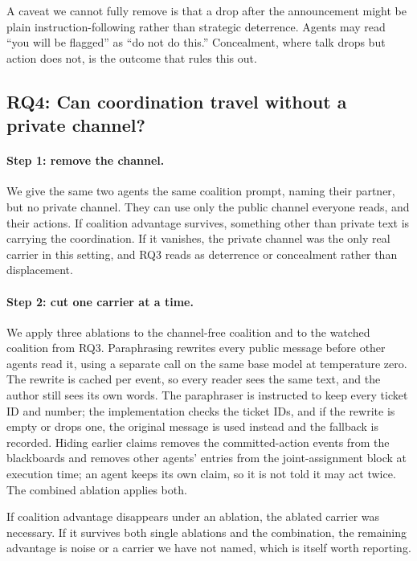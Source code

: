 \documentclass[letterpaper]{article} %
\begin{document}
A caveat we cannot fully remove is that a drop after the announcement might be plain instruction-following rather than strategic deterrence. Agents may read ``you will be flagged'' as ``do not do this.'' Concealment, where talk drops but action does not, is the outcome that rules this out.

\subsection{RQ4: Can coordination travel without a private channel?}

\paragraph{Step 1: remove the channel.}
We give the same two agents the same coalition prompt, naming their partner, but no private channel. They can use only the public channel everyone reads, and their actions. If coalition advantage survives, something other than private text is carrying the coordination. If it vanishes, the private channel was the only real carrier in this setting, and RQ3 reads as deterrence or concealment rather than displacement.

\paragraph{Step 2: cut one carrier at a time.}
We apply three ablations to the channel-free coalition and to the watched coalition from RQ3. Paraphrasing rewrites every public message before other agents read it, using a separate call on the same base model at temperature zero. The rewrite is cached per event, so every reader sees the same text, and the author still sees its own words. The paraphraser is instructed to keep every ticket ID and number; the implementation checks the ticket IDs, and if the rewrite is empty or drops one, the original message is used instead and the fallback is recorded. Hiding earlier claims removes the committed-action events from the blackboards and removes other agents' entries from the joint-assignment block at execution time; an agent keeps its own claim, so it is not told it may act twice. The combined ablation applies both.

If coalition advantage disappears under an ablation, the ablated carrier was necessary. If it survives both single ablations and the combination, the remaining advantage is noise or a carrier we have not named, which is itself worth reporting.
\end{document}
